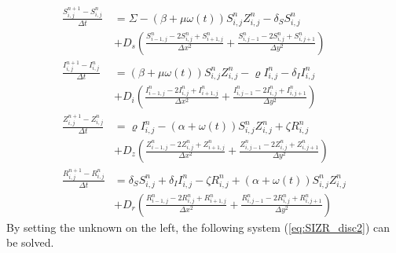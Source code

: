 \documentclass[%
twoside,                 %
final,                   %
10pt]{article}
\begin{document}
\begin{equation} \label{eq:SIZR_disc}
	\begin{aligned}
    \frac{S^{n+1}_{i,j}-S^n_{i,j}}{\Delta t} &= \Sigma - (\beta+\mu \omega(t))S^{n}_{i,j}Z^{n}_{i,j}- \delta_S S^{n}_{i,j} \\
        &+D_s\left(\frac{S^{n}_{i-1,j}-2S^{n}_{i,j}+S^{n}_{i+1,j}}{\Delta x^2}+\frac{S^{n}_{i,j-1}-2S^{n}_{i,j}+S^{n}_{i,j+1}}{\Delta y^2}\right) \\
    \frac{I^{n+1}_{i,j}-I^n_{i,j}}{\Delta t} &= (\beta+\mu \omega(t))S^{n}_{i,j}Z^{n}_{i,j}-\varrho I^{n}_{i,j}- \delta_I I^{n}_{i,j} \\
        &+D_i\left(\frac{I^{n}_{i-1,j}-2I^{n}_{i,j}+I^{n}_{i+1,j}}{\Delta x^2}+\frac{I^{n}_{i,j-1}-2I^{n}_{i,j}+I^{n}_{i,j+1}}{\Delta y^2}\right) \\
    \frac{Z^{n+1}_{i,j}-Z^n_{i,j}}{\Delta t} &= \varrho I^{n}_{i,j}-(\alpha+\omega(t))S^{n}_{i,j}Z^{n}_{i,j}+ \zeta R^{n}_{i,j} \\
        &+D_z\left(\frac{Z^{n}_{i-1,j}-2Z^{n}_{i,j}+Z^{n}_{i+1,j}}{\Delta x^2}+\frac{Z^{n}_{i,j-1}-2Z^{n}_{i,j}+Z^{n}_{i,j+1}}{\Delta y^2}\right) \\
    \frac{R^{n+1}_{i,j}-R^n_{i,j}}{\Delta t} &= \delta_S S^{n}_{i,j}+\delta_I I^{n}_{i,j}-\zeta R^{n}_{i,j}+(\alpha+\omega(t))S^{n}_{i,j}Z^{n}_{i,j} \\
        &+D_r\left(\frac{R^{n}_{i-1,j}-2R^{n}_{i,j}+R^{n}_{i+1,j}}{\Delta x^2}+\frac{R^{n}_{i,j-1}-2R^{n}_{i,j}+R^{n}_{i,j+1}}{\Delta y^2}\right) 
	\end{aligned}
\end{equation}
By setting the unknown on the left, the following system (\ref{eq:SIZR_disc2}) can be solved. 
\end{document}
